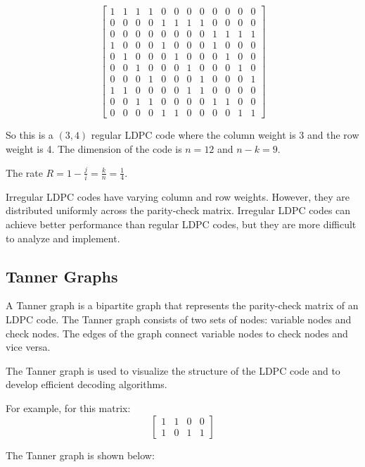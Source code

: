 \documentclass[conference]{IEEEtran}
\begin{document}
$$\begin{bmatrix}
    1 & 1 & 1 & 1 & 0 & 0 & 0 & 0 & 0 & 0 & 0 & 0 \\
    0 & 0 & 0 & 0 & 1 & 1 & 1 & 1 & 0 & 0 & 0 & 0 \\
    0 & 0 & 0 & 0 & 0 & 0 & 0 & 0 & 1 & 1 & 1 & 1 \\
    1 & 0 & 0 & 0 & 1 & 0 & 0 & 0 & 1 & 0 & 0 & 0 \\
    0 & 1 & 0 & 0 & 0 & 1 & 0 & 0 & 0 & 1 & 0 & 0 \\
    0 & 0 & 1 & 0 & 0 & 0 & 1 & 0 & 0 & 0 & 1 & 0 \\
    0 & 0 & 0 & 1 & 0 & 0 & 0 & 1 & 0 & 0 & 0 & 1 \\
    1 & 1 & 0 & 0 & 0 & 0 & 1 & 1 & 0 & 0 & 0 & 0 \\
    0 & 0 & 1 & 1 & 0 & 0 & 0 & 0 & 1 & 1 & 0 & 0 \\
    0 & 0 & 0 & 0 & 1 & 1 & 0 & 0 & 0 & 0 & 1 & 1
  \end{bmatrix}$$

So this is a $(3,4)$ regular LDPC code where the column weight is 3 and the row
weight is 4. The dimension of the code is $n=12$ and $n-k=9$.

The rate $R=1-\frac{j}{i}=\frac{k}{n}=\frac{1}{4}$.

Irregular LDPC codes have varying column and row weights. However, they are
distributed uniformly across the parity-check matrix. Irregular LDPC codes can
achieve better performance than regular LDPC codes, but they are more difficult
to analyze and implement.

\subsection{Tanner Graphs}
A Tanner graph is a bipartite graph that represents the parity-check matrix of
an LDPC code. The Tanner graph consists of two sets of nodes: variable nodes
and check nodes. The edges of the graph connect variable nodes to check nodes
and vice versa.

The Tanner graph is used to visualize the structure of the LDPC code and to
develop efficient decoding algorithms.

For example, for this matrix: \[
  \begin{bmatrix}
    1 & 1 & 0 & 0 \\
    1 & 0 & 1 & 1
  \end{bmatrix}
\]

The Tanner graph is shown below:
\end{document}
